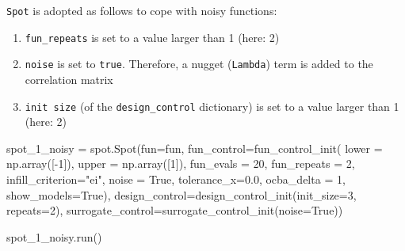 \documentclass[
  letterpaper,
  DIV=11,
  numbers=noendperiod]{scrreprt}
\newenvironment{Shaded}{\begin{snugshade}}{\end{snugshade}}
\newcommand{\DecValTok}[1]{\textcolor[rgb]{0.68,0.00,0.00}{#1}}
\newcommand{\FloatTok}[1]{\textcolor[rgb]{0.68,0.00,0.00}{#1}}
\newcommand{\NormalTok}[1]{\textcolor[rgb]{0.00,0.23,0.31}{#1}}
\newcommand{\OperatorTok}[1]{\textcolor[rgb]{0.37,0.37,0.37}{#1}}
\newcommand{\StringTok}[1]{\textcolor[rgb]{0.13,0.47,0.30}{#1}}
\newcommand{\VariableTok}[1]{\textcolor[rgb]{0.07,0.07,0.07}{#1}}
\providecommand{\tightlist}{%
  \setlength{\itemsep}{0pt}\setlength{\parskip}{0pt}}\usepackage{longtable,booktabs,array}
\begin{document}
\texttt{Spot} is adopted as follows to cope with noisy functions:

\begin{enumerate}
\def\labelenumi{\arabic{enumi}.}
\tightlist
\item
  \texttt{fun\_repeats} is set to a value larger than 1 (here: 2)
\item
  \texttt{noise} is set to \texttt{true}. Therefore, a nugget
  (\texttt{Lambda}) term is added to the correlation matrix
\item
  \texttt{init\ size} (of the \texttt{design\_control} dictionary) is
  set to a value larger than 1 (here: 2)
\end{enumerate}

\begin{Shaded}
\begin{Highlighting}[]
\NormalTok{spot\_1\_noisy }\OperatorTok{=}\NormalTok{ spot.Spot(fun}\OperatorTok{=}\NormalTok{fun,}
\NormalTok{                   fun\_control}\OperatorTok{=}\NormalTok{fun\_control\_init( }
\NormalTok{                   lower }\OperatorTok{=}\NormalTok{ np.array([}\OperatorTok{{-}}\DecValTok{1}\NormalTok{]),}
\NormalTok{                   upper }\OperatorTok{=}\NormalTok{ np.array([}\DecValTok{1}\NormalTok{]),}
\NormalTok{                   fun\_evals }\OperatorTok{=} \DecValTok{20}\NormalTok{,}
\NormalTok{                   fun\_repeats }\OperatorTok{=} \DecValTok{2}\NormalTok{,}
\NormalTok{                   infill\_criterion}\OperatorTok{=}\StringTok{"ei"}\NormalTok{,}
\NormalTok{                   noise }\OperatorTok{=} \VariableTok{True}\NormalTok{,}
\NormalTok{                   tolerance\_x}\OperatorTok{=}\FloatTok{0.0}\NormalTok{,}
\NormalTok{                   ocba\_delta }\OperatorTok{=} \DecValTok{1}\NormalTok{,                   }
\NormalTok{                   show\_models}\OperatorTok{=}\VariableTok{True}\NormalTok{),}
\NormalTok{                   design\_control}\OperatorTok{=}\NormalTok{design\_control\_init(init\_size}\OperatorTok{=}\DecValTok{3}\NormalTok{, repeats}\OperatorTok{=}\DecValTok{2}\NormalTok{),}
\NormalTok{                   surrogate\_control}\OperatorTok{=}\NormalTok{surrogate\_control\_init(noise}\OperatorTok{=}\VariableTok{True}\NormalTok{))}
\end{Highlighting}
\end{Shaded}

\begin{Shaded}
\begin{Highlighting}[]
\NormalTok{spot\_1\_noisy.run()}
\end{Highlighting}
\end{Shaded}
\end{document}
